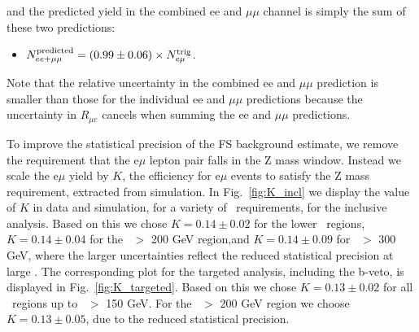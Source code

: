 and the predicted yield in the combined ee and $\mu\mu$ channel is simply the sum of these two predictions:

\begin{itemize}
\item $N_{ee+\mu\mu}^{\rm{predicted}} = (0.99\pm0.06)\times N_{e\mu}^{\rm{trig}}$.
\end{itemize}

Note that the relative uncertainty in the combined ee and $\mu\mu$ prediction is smaller than those for the individual ee and $\mu\mu$ predictions
because the uncertainty in $R_{\mu e}$ cancels when summing the ee and $\mu\mu$ predictions. %

To improve the statistical precision of the FS background estimate, we remove the requirement that the e$\mu$ lepton pair falls in the Z mass window.
Instead we scale the e$\mu$ yield by $K$, the efficiency for e$\mu$ events to satisfy the Z mass requirement, extracted from simulation. In Fig.~\ref{fig:K_incl}
we display the value of $K$ in data and simulation, for a variety of \MET\ requirements, for the inclusive analysis. 
Based on this we chose $K=0.14\pm0.02$ for the lower \MET\ regions, $K=0.14\pm0.04$ for the \MET\ $>$ 200 GeV region,and $K=0.14\pm0.09$ for \MET\ $>$ 300 GeV,
where the larger uncertainties reflect the reduced statistical precision at large \MET.
The corresponding plot for the targeted analysis, including the b-veto, is displayed in Fig.~\ref{fig:K_targeted}.
Based on this we chose $K=0.13\pm0.02$
for all \MET\ regions up to  \MET\ $>$ 150 GeV. For the \MET\ $>$ 200 GeV region we choose $K=0.13\pm0.05$, due to the reduced  statistical precision.

